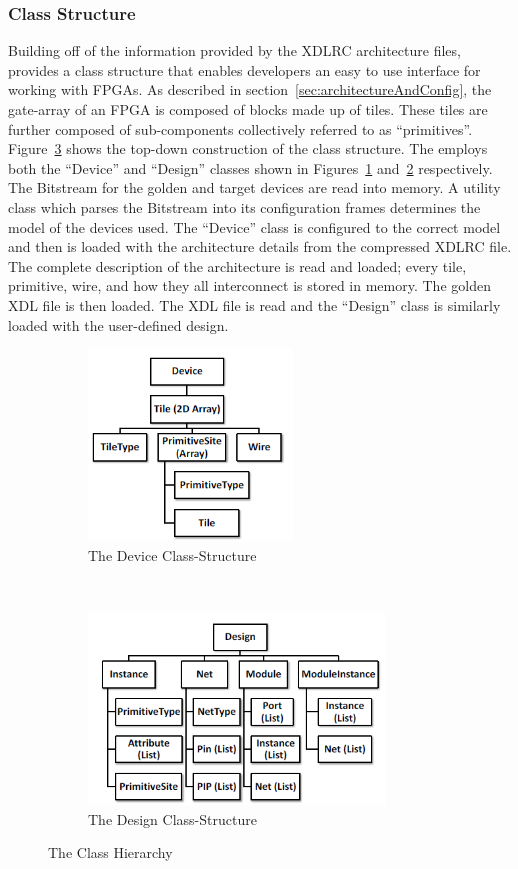 \subsubsection{Class Structure} \label{sec:classStructure}
Building off of the information provided by the XDLRC architecture files, \RapidSmith provides a class structure that enables developers an easy to use interface for working with \acrshort{FPGA}s.
As described in section~\ref{sec:architectureAndConfig}, the gate-array of an \acrshort{FPGA} is composed of blocks made up of tiles.
These tiles are further composed of sub-components collectively referred to as ``primitives''.
Figure~\ref{fig:classStructures} shows the top-down construction of the \RapidSmith class structure.
The \NameNoPeriod employs both the ``Device'' and ``Design'' classes shown in Figures~\ref{fig:rapidSmithDevice} and~\ref{fig:rapidSmithDesign} respectively.
The \gls{Bitstream} for the \gls{golden} and \gls{target} devices are read into memory. 
A utility class which parses the \gls{Bitstream} into its configuration frames determines the model of the devices used.
The ``Device'' class is configured to the correct model and then is loaded with the architecture details from the compressed XDLRC file.
The complete description of the architecture is read and loaded; every tile, primitive, wire, and how they all interconnect is stored in memory.
The \gls{golden} \acrshort{XDL} file is then loaded.
The \acrshort{XDL} file is read and the ``Design'' class is similarly loaded with the user-defined design.
\begin{figure}[h]
	\centering
	\begin{subfigure}[t]{0.5\textwidth}
			\centering
			\includegraphics[height=2in]{Figures/rapidSmithDevice}
			\caption{The Device Class-Structure}
			\label{fig:rapidSmithDevice}
	\end{subfigure}%
	~ 
	\begin{subfigure}[t]{0.5\textwidth}
		\centering
		\includegraphics[height=2in]{Figures/rapidSmithDesign}
		\caption{The Design Class-Structure}
		 \label{fig:rapidSmithDesign}
	\end{subfigure}
	\caption{The \RapidSmith Class Hierarchy~\cite{rapidSmithManual}}
	 \label{fig:classStructures}
\end{figure}
